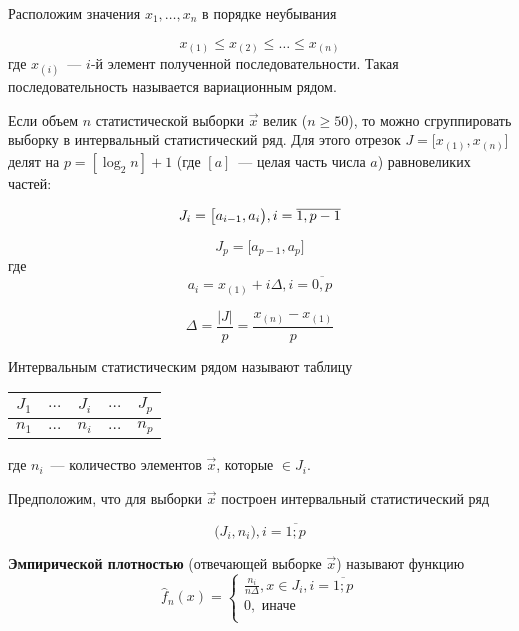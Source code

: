 Расположим значения $x_1, \ldots, x_n$ в порядке неубывания

\begin{equation*}
    x_{(1)} \le x_{(2)} \le \ldots \le x_{(n)}
\end{equation*}
где $x_{(i)}$~--- $i$-й элемент полученной последовательности. Такая последовательность называется вариационным рядом.

Если объем $n$ статистической выборки $\vec x$ велик ($n \geq 50$), то можно сгруппировать выборку в интервальный статистический ряд. Для этого отрезок $J = \big[ x_{(1)}, x_{(n)} \big]$ делят на $p = [\log_2n] + 1$ (где $[a]$~--- целая часть числа $a$) равновеликих частей:

\begin{equation*}
    J_i = \big[ a_{i-1}, a_i \big), i = \overline{1, p-1} \\
\end{equation*}

\begin{equation*}
    J_{p} = \big[ a_{p-1}, a_p \big]
\end{equation*}
где
\begin{equation*}
    a_i = x_{(1)} + i\Delta, i = \overline{0, p}
\end{equation*}

\begin{equation*}
    \Delta = \frac{|J|}{p} = \frac{x_{(n)} - x_{(1)}}{p}
\end{equation*}

Интервальным статистическим рядом называют таблицу

\begin{table}[H]
    \centering
    \begin{tabular}{|c|c|c|c|c|}
        \hline
        $J_1$ & $\dots$ & $J_i$ & $\dots$ & $J_p$ \\
        \hline
        $n_1$ & $\dots$ & $n_i$ & $\dots$ & $n_p$ \\
        \hline
    \end{tabular}
\end{table}
где $n_i$~--- количество элементов $\vec x$, которые $\in J_i$.

Предположим, что для выборки $\vec x$ построен интервальный статистический
ряд

\begin{equation*}
    \big( J_i, n_i \big), i = \overline{1; p}
\end{equation*}

\textbf{Эмпирической плотностью} (отвечающей выборке $\vec x$) называют функцию
\begin{equation*}
    \hat f_n(x) =
    \begin{cases}
        \frac{n_i}{n \Delta}, x \in J_i, i = \overline{1; p} \\
        0, \text{ иначе} \\
    \end{cases}
\end{equation*}

